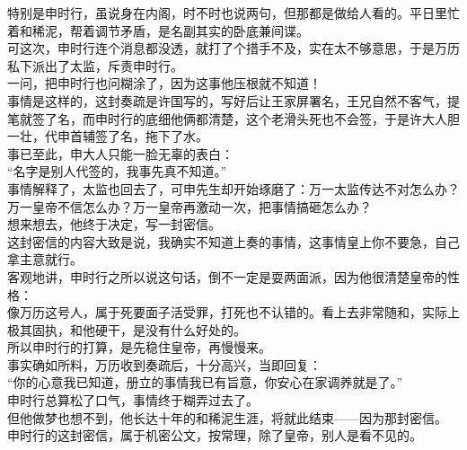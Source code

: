 \begin{multicols}{\theparacolNo}
特别是申时行，虽说身在内阁，时不时也说两句，但那都是做给人看的。平日里忙着和稀泥，帮着调节矛盾，是名副其实的卧底兼间谍。\\

可这次，申时行连个消息都没透，就打了个措手不及，实在太不够意思，于是万历私下派出了太监，斥责申时行。\\

一问，把申时行也问糊涂了，因为这事他压根就不知道！\\

事情是这样的，这封奏疏是许国写的，写好后让王家屏署名，王兄自然不客气，提笔就签了名，而申时行的底细他俩都清楚，这个老滑头死也不会签，于是许大人胆一壮，代申首辅签了名，拖下了水。\\

事已至此，申大人只能一脸无辜的表白：\\

“名字是别人代签的，我事先真不知道。”\\

事情解释了，太监也回去了，可申先生却开始琢磨了：万一太监传达不对怎么办？万一皇帝不信怎么办？万一皇帝再激动一次，把事情搞砸怎么办？\\

想来想去，他终于决定，写一封密信。\\

这封密信的内容大致是说，我确实不知道上奏的事情，这事情皇上你不要急，自己拿主意就行。\\

客观地讲，申时行之所以说这句话，倒不一定是耍两面派，因为他很清楚皇帝的性格：\\

像万历这号人，属于死要面子活受罪，打死也不认错的。看上去非常随和，实际上极其固执，和他硬干，是没有什么好处的。\\

所以申时行的打算，是先稳住皇帝，再慢慢来。\\

事实确如所料，万历收到奏疏后，十分高兴，当即回复：\\

“你的心意我已知道，册立的事情我已有旨意，你安心在家调养就是了。”\\

申时行总算松了口气，事情终于糊弄过去了。\\

但他做梦也想不到，他长达十年的和稀泥生涯，将就此结束——因为那封密信。\\

申时行的这封密信，属于机密公文，按常理，除了皇帝，别人是看不见的。\\


\end{multicols}

